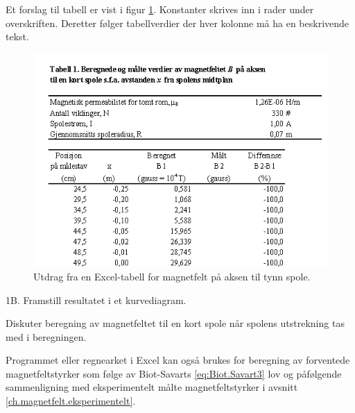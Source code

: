 \documentclass[../Elmag-labhefte-2020.tex]{subfiles}
\begin{document}
Et forslag til tabell er vist i figur \ref{magnetfelt.tab1}. 
Konstanter skrives inn i rader under overskriften. Deretter følger tabellverdier der hver kolonne må ha en beskrivende tekst. 
%
\begin{figure}[!ht]
    \begin{center}
    \includegraphics[scale=0.9]{fig/magnetfelt-tab1.png}

    \end{center}
    \caption{%
        Utdrag fra en Excel-tabell for magnetfelt på aksen til tynn spole.
    }
    \label{magnetfelt.tab1}
\end{figure}

{\itsf 1B. Framstill resultatet i et kurvediagram.}

{\itsf Diskuter beregning av magnetfeltet til en kort spole når spolens utstrekning tas med i beregningen.}

Programmet eller regnearket i Excel kan også brukes for beregning av forventede magnetfeltstyrker som følge av Biot-Savarts \eqref{eq:Biot.Savart3} lov og påfølgende sammenligning med eksperimentelt målte magnetfeltstyrker i avsnitt \ref{ch.magnetfelt.eksperimentelt}.
\end{document}
